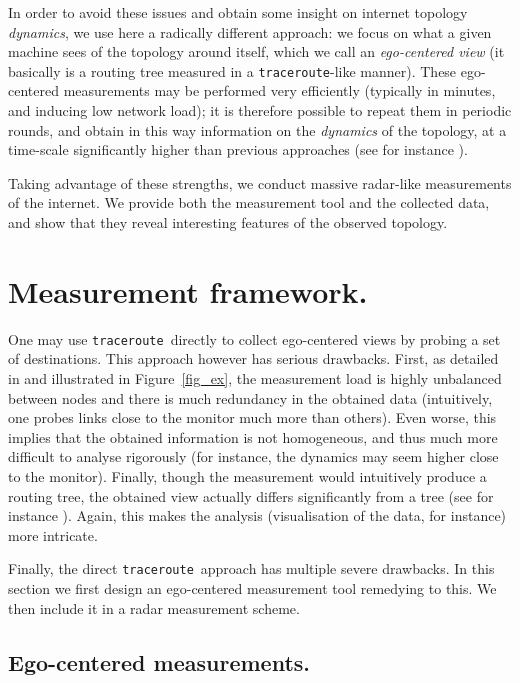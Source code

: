 \documentclass[times, 10pt,twocolumn]{article}
\newcommand{\traceroute}{{\tt trace\-route}}
\begin{document}
In order to avoid these issues and obtain some insight on internet topology {\em dynamics}, 
we use here a radically different approach: we focus on what a given machine sees of the topology around itself, which we call an {\em ego-centered view} (it basically is a routing tree measured in a \traceroute-like manner). 
These ego-centered measurements may be performed very efficiently (typically in minutes, and inducing low network load); it is therefore possible to repeat them in periodic rounds, and obtain in this way information on the {\em dynamics} of the topology, at a time-scale significantly higher than previous approaches (see for instance \cite{oliveira2007evol,plrevisited}).

Taking advantage of these strengths, we conduct massive radar-like measurements of the internet. We provide both the measurement tool and the collected data, and show that they reveal interesting features of the observed topology.

\section{Measurement framework.}
\label{sec_tools}

One may use \traceroute\ directly to collect ego-cent\-ered views by probing a set of destinations.
This approach however has serious drawbacks. First, as detailed in
\cite{DTSigmetrics} and illustrated in Figure~\ref{fig_ex}, the
measurement load is highly unbalanced between nodes and there is much
redundancy in the obtained data (intuitively, one probes links close
to the monitor much more than others). Even worse, this implies that
the obtained information is not homogeneous, and thus much more
difficult to analyse rigorously (for instance, the dynamics may seem
higher close to the monitor). Finally, though the measurement would
intuitively produce a routing tree, the obtained view actually differs
significantly from a tree (see for instance \cite{parisTraceroute}). Again,
this makes the analysis (visualisation of the data, for instance) more
intricate.

Finally, the direct \traceroute\ approach has multiple severe
drawbacks. In this section we first design an ego-centered measurement
tool remedying to this. We then include it in a radar measurement
scheme.

\subsection{Ego-centered measurements.}
\label{sec_tracetree}
\end{document}

